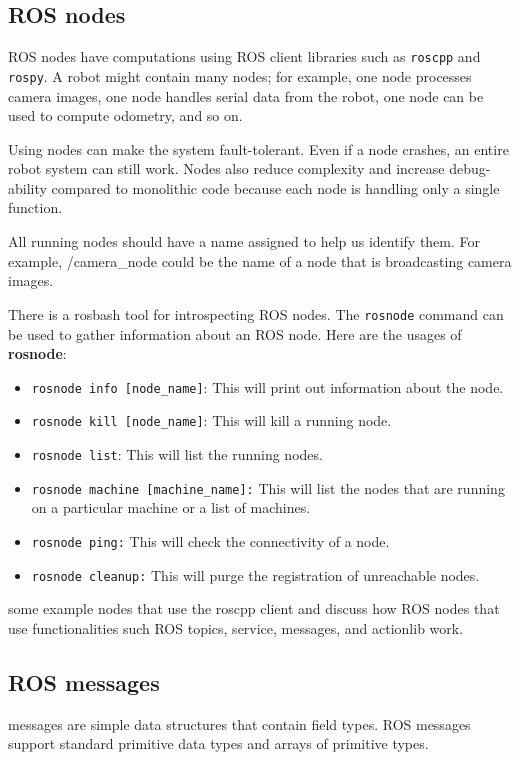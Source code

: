 \documentclass[../../main]{subfiles}
\begin{document}
\subsection{ROS nodes}
ROS nodes have computations using ROS client libraries such as \texttt{roscpp} and \texttt{rospy}. A robot might contain many nodes; for example, one node processes camera images, one node handles serial data from the robot, one node can be used to compute odometry, and so on.

Using nodes can make the system fault-tolerant. Even if a node crashes, an entire robot system can still work. Nodes also reduce complexity and increase debug-ability compared to monolithic code because each node is handling only a single function.

All running nodes should have a name assigned to help us identify them. For example, /camera\_node could be the name of a node that is broadcasting camera images.

There is a rosbash tool for introspecting ROS nodes. The \texttt{rosnode} command can be used to gather information about an ROS node. Here are the usages of \textbf{rosnode}:

\begin{itemize}
    \item \texttt{rosnode info [node\_name]}: This will print out information about the node.
    \item \texttt{rosnode kill [node\_name]}: This will kill a running node.
    \item \texttt{rosnode list}: This will list the running nodes.
    \item  \texttt{rosnode machine [machine\_name]:} This will list the nodes that are running
    on a particular machine or a list of machines.
    \item  \texttt{rosnode ping:} This will check the connectivity of a node.
    \item  \texttt{rosnode cleanup:} This will purge the registration of unreachable nodes.
\end{itemize}
some example nodes that use the roscpp client and discuss how
ROS nodes that use functionalities such ROS topics, service, messages, and actionlib
work.
\subsection{ROS messages}\label{message}
messages are simple data structures that contain field types. ROS messages support standard primitive data types and arrays of primitive types.
\end{document}
